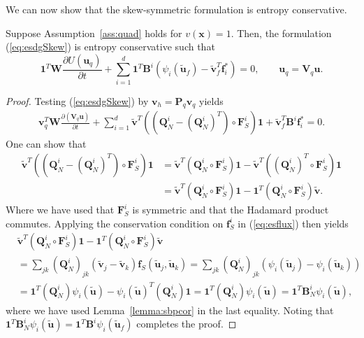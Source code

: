 \documentclass{svjour3}                     %
\renewcommand{\tilde}{\widetilde}
\newcommand{\pd}[2]{\frac{\partial#1}{\partial#2}}
\newcommand{\LRp}[1]{\left( #1 \right)}
\begin{document}
We can now show that the skew-symmetric formulation is entropy conservative.  
\begin{theorem}
Suppose Assumption~\ref{ass:quad} holds for $v(\bm{x}) = 1$.  
Then, the formulation (\ref{eq:esdgSkew}) is entropy conservative such that
\begin{equation}
\bm{1}^T\bm{W}\pd{U(\bm{u}_q)}{t} + \sum_{i=1}^d\bm{1}^T\bm{B}^i \LRp{\psi_i(\tilde{\bm{u}}_f) - \tilde{\bm{v}}_f^T\bm{f}_i^*} = 0, \qquad \bm{u}_q = \bm{V}_q\bm{u}.
\label{eq:esdgthm}
\end{equation}
\label{thm:esdg}
\end{theorem}
\begin{proof}
Testing (\ref{eq:esdgSkew}) by $\bm{v}_h = \bm{P}_q\bm{v}_q$ yields 
\begin{align}
\bm{v}_q^T\bm{W}\pd{\LRp{\bm{V}_q\bm{u}}}{t} + \sum_{i=1}^d
\tilde{\bm{v}}^T \LRp{\LRp{\bm{Q}^i_N - \LRp{\bm{Q}^i_N}^T} \circ \bm{F}^i_S}\bm{1} + \tilde{\bm{v}}_f^T \bm{B}^i\bm{f}_i^* = 0.
\end{align}
One can show that \cite{chan2017discretely}
\begin{align*}
\tilde{\bm{v}}^T \LRp{\LRp{\bm{Q}^i_N - \LRp{\bm{Q}^i_N}^T} \circ \bm{F}^i_S}\bm{1} &= \tilde{\bm{v}}^T \LRp{\bm{Q}^i_N \circ \bm{F}^i_S}\bm{1} - \tilde{\bm{v}}^T \LRp{\LRp{\bm{Q}^i_N}^T \circ \bm{F}^i_S}\bm{1}\\
&= \tilde{\bm{v}}^T \LRp{\bm{Q}^i_N \circ \bm{F}^i_S}\bm{1} - \bm{1}^T \LRp{{\bm{Q}^i_N} \circ \bm{F}^i_S}\tilde{\bm{v}}.
\end{align*}
Where we have used that $\bm{F}^i_S$ is symmetric and that the Hadamard product commutes.  Applying the conservation condition on $\bm{f}^i_S$ in (\ref{eq:esflux}) then yields
\begin{align*}
&\tilde{\bm{v}}^T \LRp{\bm{Q}^i_N \circ \bm{F}^i_S}\bm{1} - \bm{1}^T \LRp{{\bm{Q}^i_N} \circ \bm{F}^i_S}\tilde{\bm{v}} \\
&= \sum_{jk} \LRp{\bm{Q}^i_N}_{jk} \LRp{\tilde{\bm{v}}_j-\tilde{\bm{v}}_k} \bm{f}_S\LRp{\tilde{\bm{u}}_j,\tilde{\bm{u}}_k} = \sum_{jk} \LRp{\bm{Q}^i_N}_{jk} \LRp{\psi_i(\tilde{\bm{u}}_j) - \psi_i(\tilde{\bm{u}}_k)}\\
&= \bm{1}^T\LRp{\bm{Q}^i_N}\psi_i(\tilde{\bm{u}}) - \psi_i(\tilde{\bm{u}})^T\LRp{\bm{Q}^i_N}\bm{1} = \bm{1}^T\LRp{\bm{Q}^i_N}\psi_i(\tilde{\bm{u}}) = \bm{1}^T\bm{B}^i_N\psi_i(\tilde{\bm{u}}),
\end{align*}
where we have used Lemma~\ref{lemma:sbpcor} in the last equality.  Noting that $\bm{1}^T\bm{B}^i_N\psi_i(\tilde{\bm{u}}) = \bm{1}^T\bm{B}^i \psi_i(\tilde{\bm{u}}_f)$ completes the proof.
\end{proof}
\end{document}
